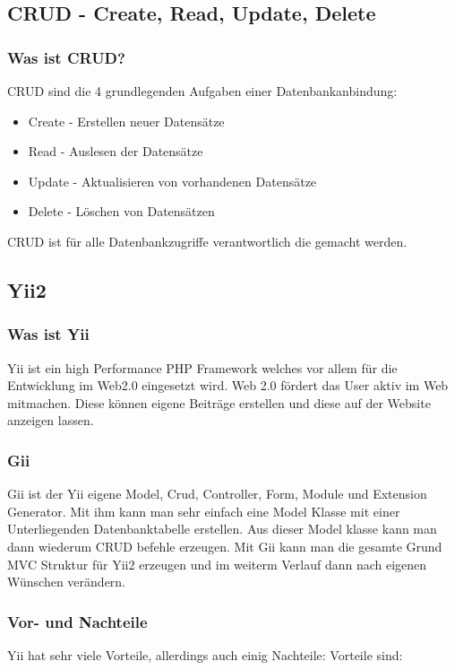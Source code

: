 \subsection{CRUD - Create, Read, Update, Delete} \label{sec:CRUD}

\subsubsection{Was ist CRUD?}
CRUD sind die 4 grundlegenden Aufgaben einer Datenbankanbindung:
\begin{itemize}
	\item Create - Erstellen neuer Datensätze
	\item Read - Auslesen der Datensätze
	\item Update - Aktualisieren von vorhandenen Datensätze
	\item Delete - Löschen von Datensätzen
\end{itemize}
\cite{CRUD}
\newline
CRUD ist für alle Datenbankzugriffe verantwortlich die gemacht werden.


\subsection{Yii2} \label{sec:YII2}

\subsubsection{Was ist Yii}
Yii ist ein high Performance PHP Framework welches vor allem für die Entwicklung im Web2.0 eingesetzt wird. Web 2.0 fördert das User aktiv im Web mitmachen. Diese können eigene Beiträge erstellen und diese auf der Website anzeigen lassen.\cite{Web_2}

\subsubsection{Gii} \label{sec:gii}
Gii ist der Yii eigene Model, Crud, Controller, Form, Module und Extension Generator. Mit ihm kann man sehr einfach eine Model Klasse mit einer Unterliegenden Datenbanktabelle erstellen. Aus dieser Model klasse kann man dann wiederum CRUD befehle erzeugen. Mit Gii kann man die gesamte Grund MVC Struktur für Yii2 erzeugen und im weiterm Verlauf dann nach eigenen Wünschen verändern.

\subsubsection{Vor- und Nachteile}
Yii hat sehr viele Vorteile, allerdings auch einig Nachteile:
Vorteile sind:

